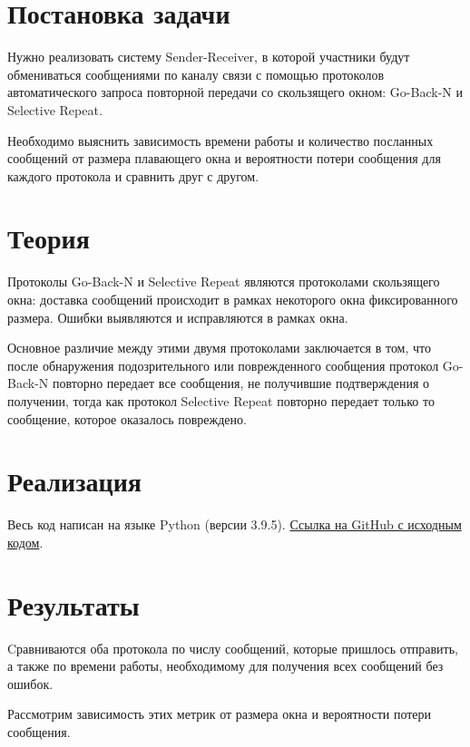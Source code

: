 \documentclass[a4paper,12pt]{article}
\begin{document}
    
    \newpage

    \tableofcontents
    \listoffigures
    \newpage

    \section{Постановка задачи}
    \quad Нужно реализовать систему Sender-Receiver,
    в которой участники будут обмениваться сообщениями по каналу связи с помощью протоколов автоматического запроса повторной передачи
    со скользящего окном: Go-Back-N и Selective Repeat.

    Необходимо выяснить зависимость времени работы и количество посланных сообщений от размера плавающего окна и вероятности потери сообщения для каждого протокола и сравнить друг с другом.

    \section{Теория}
    \quad Протоколы Go-Back-N и Selective Repeat являются протоколами скользящего окна: доставка сообщений происходит в рамках некоторого окна фиксированного размера. Ошибки выявляются и исправляются в рамках окна.

    Основное различие между этими двумя протоколами заключается в том, что после обнаружения подозрительного или поврежденного сообщения протокол Go-Back-N повторно передает все сообщения, не получившие подтверждения о получении, тогда как протокол Selective Repeat повторно передает только то сообщение, которое оказалось повреждено.

    \section{Реализация}
    \quad Весь код написан на языке Python (версии 3.9.5).
    \href{https://github.com/BoIlAl/Networks/tree/master/lab1}{Ссылка на GitHub с исходным кодом}.

    \section{Результаты}
    \quad Cравниваются  оба протокола по числу сообщений, которые пришлось отправить, а также по времени
    работы, необходимому для получения всех сообщений без ошибок.
    
    Рассмотрим зависимость этих метрик от размера окна и вероятности потери сообщения.
\end{document}
